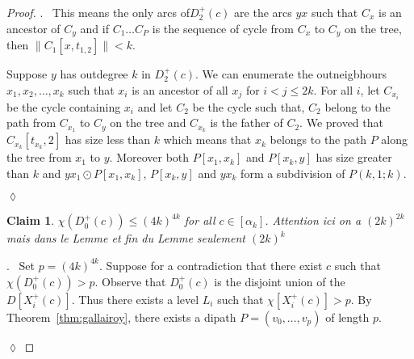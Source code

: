 \documentclass[utf8,10pt]{article}
\theoremstyle{plain}
\newtheorem{claim}{Claim}[theorem]
\theoremstyle{definition}
\theoremstyle{remark}
\newcommand{\FH}[1]{{\color{red}{\bf Fred:} #1}}
\newenvironment{subproof}{\par\noindent {\it Subproof}.\ }{\hfill$\lozenge$\par\vspace{11pt}}
\begin{document}
\begin{proof}
\begin{subproof}
This means the only arcs of$D^+_2(c)$ are the arcs $yx$ such that $C_x$ is an ancestor of $C_y$ and if $C_1 \dots C_P$ is the
sequence of cycle from $C_x$ to $C_y$ on the tree, then $ \| C_1[x,t_{1,2}] \| < k$. 

Suppose $y$ has outdegree $k$ in $D^+_2(c)$. We can enumerate the outneigbhours $x_1, x_2, \dots, x_k$ such that
$x_i$ is an ancestor of all $x_j$ for $i<j \leq 2k$. For all $i$, let $C_{x_i}$ be the cycle containing $x_i$ and let
$C_2$ be the cycle such that, $C_2$ belong to the path from $C_{x_1}$ to $C_y$ on the tree and $C_{x_k}$ is the father of $C_2$.
 We proved that $C_{x_k}[t_{x_k},2]$ has size less than $k$ which means that $x_k$ belongs to the path $P$ along the tree from $x_1$
 to $y$. Moreover both $P[x_1, x_k]$ and $P[x_k, y]$ has size greater than $k$ and $yx_1 \odot P[x_1, x_k]$,  $P[x_k, y]$ and $yx_k$
 form a subdivision of $P(k,1;k)$. 

%
%
%
%
\end{subproof}



\begin{claim}\label{claim:D0}
$\chi(D^+_0(c))\leq (4k)^{4k}$ for all $c\in [\alpha_k]$. \FH{Attention ici on a $(2k)^{2k}$ mais dans le Lemme et fin du Lemme seulement $(2k)^k$}
\end{claim}
\begin{subproof}
Set $p=(4k)^{4k}$.
Suppose for a contradiction that there exist $c$ such that $\chi(D^+_0(c)) > p$. 
Observe that $D^+_0(c)$ is the disjoint union of the $D[X^+_i(c)]$. Thus there exists a level $L_i$ such that $\chi[X^+_i(c)] >p$.
 By Theorem~\ref{thm:gallairoy}, there exists a dipath $P=(v_0,  \dots , v_{p})$ of length $p$.


\end{subproof}
\end{proof}
\end{document}
